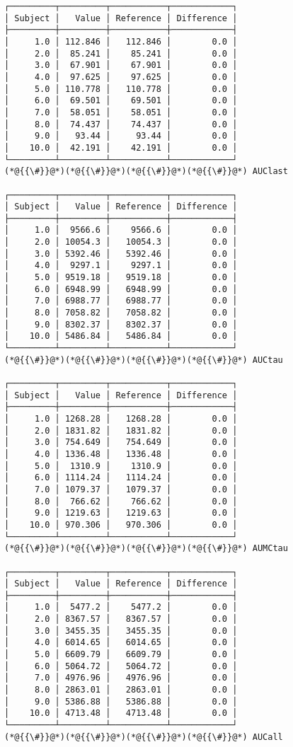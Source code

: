 \documentclass[12pt,a4paper]{article}
\begin{document}
\begin{lstlisting}
┌─────────┬─────────┬───────────┬────────────┐
│ Subject │   Value │ Reference │ Difference │
├─────────┼─────────┼───────────┼────────────┤
│     1.0 │ 112.846 │   112.846 │        0.0 │
│     2.0 │  85.241 │    85.241 │        0.0 │
│     3.0 │  67.901 │    67.901 │        0.0 │
│     4.0 │  97.625 │    97.625 │        0.0 │
│     5.0 │ 110.778 │   110.778 │        0.0 │
│     6.0 │  69.501 │    69.501 │        0.0 │
│     7.0 │  58.051 │    58.051 │        0.0 │
│     8.0 │  74.437 │    74.437 │        0.0 │
│     9.0 │   93.44 │     93.44 │        0.0 │
│    10.0 │  42.191 │    42.191 │        0.0 │
└─────────┴─────────┴───────────┴────────────┘
(*@{{\#}}@*)(*@{{\#}}@*)(*@{{\#}}@*)(*@{{\#}}@*) AUClast

┌─────────┬─────────┬───────────┬────────────┐
│ Subject │   Value │ Reference │ Difference │
├─────────┼─────────┼───────────┼────────────┤
│     1.0 │  9566.6 │    9566.6 │        0.0 │
│     2.0 │ 10054.3 │   10054.3 │        0.0 │
│     3.0 │ 5392.46 │   5392.46 │        0.0 │
│     4.0 │  9297.1 │    9297.1 │        0.0 │
│     5.0 │ 9519.18 │   9519.18 │        0.0 │
│     6.0 │ 6948.99 │   6948.99 │        0.0 │
│     7.0 │ 6988.77 │   6988.77 │        0.0 │
│     8.0 │ 7058.82 │   7058.82 │        0.0 │
│     9.0 │ 8302.37 │   8302.37 │        0.0 │
│    10.0 │ 5486.84 │   5486.84 │        0.0 │
└─────────┴─────────┴───────────┴────────────┘
(*@{{\#}}@*)(*@{{\#}}@*)(*@{{\#}}@*)(*@{{\#}}@*) AUCtau

┌─────────┬─────────┬───────────┬────────────┐
│ Subject │   Value │ Reference │ Difference │
├─────────┼─────────┼───────────┼────────────┤
│     1.0 │ 1268.28 │   1268.28 │        0.0 │
│     2.0 │ 1831.82 │   1831.82 │        0.0 │
│     3.0 │ 754.649 │   754.649 │        0.0 │
│     4.0 │ 1336.48 │   1336.48 │        0.0 │
│     5.0 │  1310.9 │    1310.9 │        0.0 │
│     6.0 │ 1114.24 │   1114.24 │        0.0 │
│     7.0 │ 1079.37 │   1079.37 │        0.0 │
│     8.0 │  766.62 │    766.62 │        0.0 │
│     9.0 │ 1219.63 │   1219.63 │        0.0 │
│    10.0 │ 970.306 │   970.306 │        0.0 │
└─────────┴─────────┴───────────┴────────────┘
(*@{{\#}}@*)(*@{{\#}}@*)(*@{{\#}}@*)(*@{{\#}}@*) AUMCtau

┌─────────┬─────────┬───────────┬────────────┐
│ Subject │   Value │ Reference │ Difference │
├─────────┼─────────┼───────────┼────────────┤
│     1.0 │  5477.2 │    5477.2 │        0.0 │
│     2.0 │ 8367.57 │   8367.57 │        0.0 │
│     3.0 │ 3455.35 │   3455.35 │        0.0 │
│     4.0 │ 6014.65 │   6014.65 │        0.0 │
│     5.0 │ 6609.79 │   6609.79 │        0.0 │
│     6.0 │ 5064.72 │   5064.72 │        0.0 │
│     7.0 │ 4976.96 │   4976.96 │        0.0 │
│     8.0 │ 2863.01 │   2863.01 │        0.0 │
│     9.0 │ 5386.88 │   5386.88 │        0.0 │
│    10.0 │ 4713.48 │   4713.48 │        0.0 │
└─────────┴─────────┴───────────┴────────────┘
(*@{{\#}}@*)(*@{{\#}}@*)(*@{{\#}}@*)(*@{{\#}}@*) AUCall


\end{lstlisting}
\end{document}
